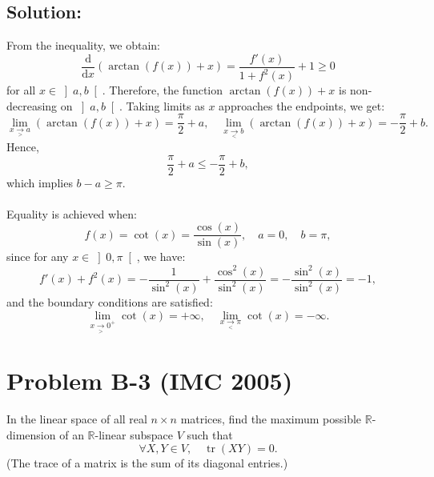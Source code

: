 \documentclass[11pt, a4paper, oneside]{article}
\newcommand{\problem}[1][]{\section{#1} \hfill \par}
\newcommand{\solution}[1][]{\subsection*{#1}\hfill \par}
\theoremstyle{remark}
\theoremstyle{lemma}
\begin{document}
\solution[Solution:]
From the inequality, we obtain:
\[
\frac{\mathrm{d}}{\mathrm{d}x} \left( \arctan(f(x)) + x \right) = \frac{f'(x)}{1 + f^2(x)} + 1 \geq 0
\]
for all \( x \in \left]a, b\right[ \). Therefore, the function \( \arctan(f(x)) + x \) is non-decreasing on \( \left]a, b\right[ \). Taking limits as \( x \) approaches the endpoints, we get:
\[
\lim_{x\underset{>}{\to} a} \left( \arctan(f(x)) + x \right) = \frac{\pi}{2} + a, \quad \lim_{x\underset{<}{\to} b} \left( \arctan(f(x)) + x \right) = -\frac{\pi}{2} + b.
\]
Hence,
\[
\frac{\pi}{2} + a \leq -\frac{\pi}{2} + b,
\]
which implies \( b - a \geq \pi \).
\\\\
Equality is achieved when:
\[
f(x) = \cot(x) = \frac{\cos(x)}{\sin(x)}, \quad a = 0, \quad b = \pi,
\]
since for any \( x \in \left]0, \pi\right[ \), we have:
\[
f'(x) + f^2(x) = -\frac{1}{\sin^2(x)} + \frac{\cos^2(x)}{\sin^2(x)} = -\frac{\sin^2(x)}{\sin^2(x)} = -1,
\]
and the boundary conditions are satisfied:
\[
\lim_{x \underset{>}{\to} 0^+} \cot(x) = +\infty, \quad \lim_{ x\underset{<}{\to} \pi} \cot(x) = -\infty.
\]

\newpage
\problem[Problem B-3 (IMC 2005)]
In the linear space of all real \( n \times n \) matrices, find the maximum possible \( \mathbb{R} \)-dimension of an \( \mathbb{R} \)-linear subspace \( V \) such that
\[
    \forall X, Y \in V, \quad \operatorname{tr}\left(XY\right) = 0.
\]
(The trace of a matrix is the sum of its diagonal entries.)
\end{document}
